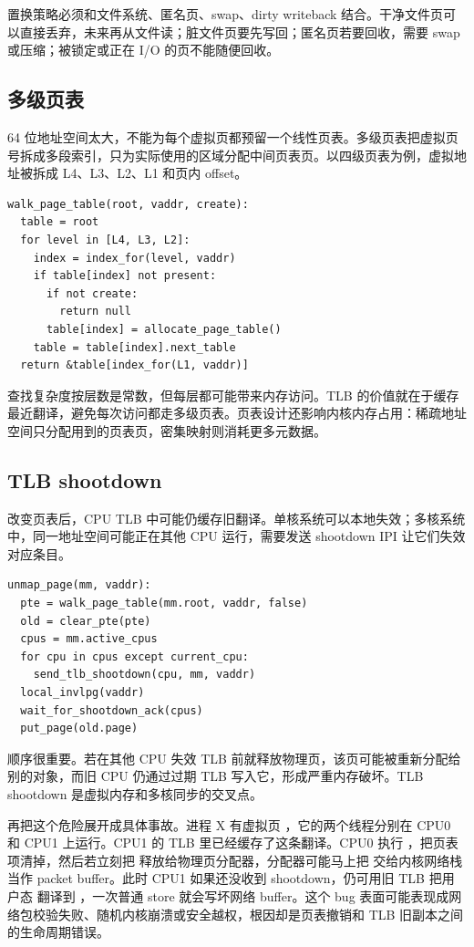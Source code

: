 置换策略必须和文件系统、匿名页、swap、dirty writeback 结合。干净文件页可以直接丢弃，未来再从文件读；脏文件页要先写回；匿名页若要回收，需要 swap 或压缩；被锁定或正在 I/O 的页不能随便回收。

\subsection{多级页表}

64 位地址空间太大，不能为每个虚拟页都预留一个线性页表。多级页表把虚拟页号拆成多段索引，只为实际使用的区域分配中间页表页。以四级页表为例，虚拟地址被拆成 L4、L3、L2、L1 和页内 offset。

\begin{lstlisting}
walk_page_table(root, vaddr, create):
  table = root
  for level in [L4, L3, L2]:
    index = index_for(level, vaddr)
    if table[index] not present:
      if not create:
        return null
      table[index] = allocate_page_table()
    table = table[index].next_table
  return &table[index_for(L1, vaddr)]
\end{lstlisting}

查找复杂度按层数是常数，但每层都可能带来内存访问。TLB 的价值就在于缓存最近翻译，避免每次访问都走多级页表。页表设计还影响内核内存占用：稀疏地址空间只分配用到的页表页，密集映射则消耗更多元数据。

\subsection{TLB shootdown}

改变页表后，CPU TLB 中可能仍缓存旧翻译。单核系统可以本地失效；多核系统中，同一地址空间可能正在其他 CPU 运行，需要发送 shootdown IPI 让它们失效对应条目。

\begin{lstlisting}
unmap_page(mm, vaddr):
  pte = walk_page_table(mm.root, vaddr, false)
  old = clear_pte(pte)
  cpus = mm.active_cpus
  for cpu in cpus except current_cpu:
    send_tlb_shootdown(cpu, mm, vaddr)
  local_invlpg(vaddr)
  wait_for_shootdown_ack(cpus)
  put_page(old.page)
\end{lstlisting}

顺序很重要。若在其他 CPU 失效 TLB 前就释放物理页，该页可能被重新分配给别的对象，而旧 CPU 仍通过过期 TLB 写入它，形成严重内存破坏。TLB shootdown 是虚拟内存和多核同步的交叉点。

再把这个危险展开成具体事故。进程 X 有虚拟页 ，它的两个线程分别在 CPU0 和 CPU1 上运行。CPU1 的 TLB 里已经缓存了这条翻译。CPU0 执行 ，把页表项清掉，然后若立刻把  释放给物理页分配器，分配器可能马上把  交给内核网络栈当作 packet buffer。此时 CPU1 如果还没收到 shootdown，仍可用旧 TLB 把用户态  翻译到 ，一次普通 store 就会写坏网络 buffer。这个 bug 表面可能表现成网络包校验失败、随机内核崩溃或安全越权，根因却是页表撤销和 TLB 旧副本之间的生命周期错误。

